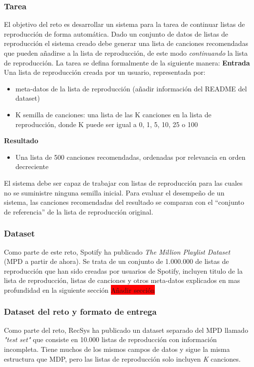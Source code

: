\documentclass{article}
\begin{document}
	\subsubsection{Tarea}
	El objetivo del reto es desarrollar un sistema para la tarea de continuar listas de reproducción de forma automática. Dado un conjunto de datos de listas de reproducción el sistema creado debe generar una lista de canciones recomendadas que pueden añadirse a la lista de reproducción, de este modo \textit{continuando} la lista de reproducción. La tarea se defina formalmente de la siguiente manera:
	\textbf{Entrada}
	Una lista de reproducción creada por un usuario, representada por:
	\begin{itemize}
		\item meta-datos de la lista de reproducción (añadir información del README del dataset)
		\item K semilla de canciones: una lista de las K canciones en la lista de reproducción, donde K puede ser igual a 0, 1, 5, 10, 25 o 100
	\end{itemize}
	\textbf{Resultado}
	\begin{itemize}
		\item Una lista de 500 canciones recomendadas, ordenadas por relevancia en orden decreciente
	\end{itemize}
	El sistema debe ser capaz de trabajar con listas de reproducción para las cuales no se suministre ninguna semilla inicial. Para evaluar el desempeño de un sistema, las canciones recomendadas del resultado se comparan con el ``conjunto de referencia'' de la lista de reproducción original.
	\subsubsection{Dataset}
	Como parte de este reto, Spotify ha publicado \textit{The Million Playlist Dataset} (MPD a partir de ahora). Se trata de un conjunto de 1.000.000 de listas de reproducción que han sido creadas por usuarios de Spotify, incluyen titulo de la lista de reproducción, listas de canciones y otros meta-datos explicados en mas profundidad en la siguiente sección \colorbox{red}{Añadir sección} 
	\subsubsection{Dataset del reto y formato de entrega}
	Como parte del reto, RecSys ha publicado un dataset separado del MPD llamado \textit{"test set"} que consiste en 10.000 listas de reproducción con información incompleta. Tiene muchos de los mismos campos de datos y sigue la misma estructura que MDP, pero las listas de reproducción solo incluyen \textit{K} canciones.
\end{document}
